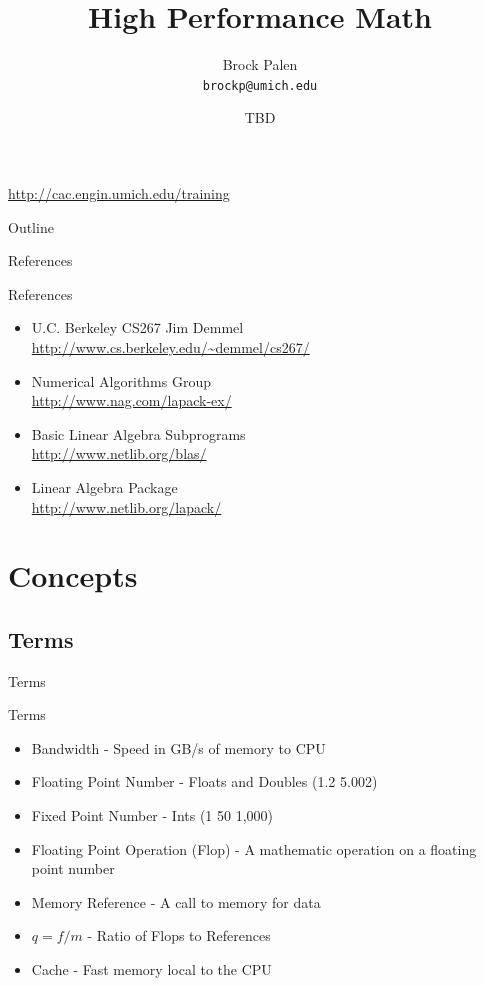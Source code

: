 \documentclass[handout]{beamer}
\title[CAC High Performance Math] {High Performance Math}
\author{Brock Palen\\ \texttt{brockp@umich.edu}}
\date{TBD}
\begin{document}
  \begin{frame}
    \titlepage
    \url{http://cac.engin.umich.edu/training}
  \end{frame}

  \begin{frame}{Outline}
    \tableofcontents
  \end{frame}
 
\begin{frame}{References}
 \begin{block}{References}
  \begin{itemize}
   \item U.C. Berkeley CS267 Jim Demmel \\
     \url{http://www.cs.berkeley.edu/~demmel/cs267/}
   \item Numerical Algorithms Group     \\
     \url{http://www.nag.com/lapack-ex/}
   \item Basic Linear Algebra Subprograms \\
     \url{http://www.netlib.org/blas/}
   \item Linear Algebra Package         \\
     \url{http://www.netlib.org/lapack/}
  \end{itemize}
 \end{block}
\end{frame} 



\section{Concepts}
\subsection{Terms}
\begin{frame}{Terms}
 \begin{block}{Terms}
  \begin{itemize}
   \item<1-> Bandwidth - Speed in GB/s of memory to CPU
   \item<2-> Floating Point Number - Floats and Doubles (1.2 5.002)
   \item<2-> Fixed Point Number - Ints (1 50 1,000)
   \item<3-> Floating Point Operation (Flop) - A mathematic operation on a floating point number
   \item<4-> Memory Reference - A call to memory for data
   \item<5->  $q=f/m$ - Ratio of Flops to References
   \item<6-> Cache - Fast memory local to the CPU
  \end{itemize}
 \end{block}
\end{frame}
\end{document}
